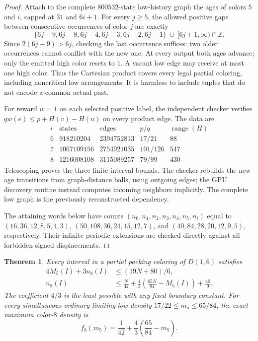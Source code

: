 \documentclass[11pt,reqno]{amsart}
\theoremstyle{plain}
\newtheorem{theorem}{Theorem}
\newcommand{\D}[1]{D(1,#1)}
\theoremstyle{plain}
\theoremstyle{plain}
\begin{document}
\begin{proof}
Attach to the complete $800532$-state low-history graph the ages of colors
$5$ and $i$, capped at $31$ and $6i+1$. For every $j\ge5$, the allowed
positive gaps between consecutive occurrences of color $j$ are exactly
\[
 \{6j-9,6j-8,6j-4,6j-3,6j-2,6j-1\}\ \cup\ [6j+1,\infty)\cap\mathbb Z.
\]
Since $2(6j-9)>6j$, checking the last occurrence suffices: two older
occurrences cannot conflict with the new one. At every output both ages
advance; only the emitted high color resets to $1$. A vacant low edge
may receive at most one high color. Thus the Cartesian product covers
every legal partial coloring, including noncritical low arrangements.
It is harmless to include tuples that do not encode a common actual past.

For reward $w=1$ on each selected positive label, the independent checker
verifies $qw(e)\le p+H(v)-H(u)$ on every product edge. The data are
\[
\begin{array}{c|r|r|c|r}
 i&\text{states}&\text{edges}&p/q&\operatorname{range}(H)\\\hline
 6&918210204&2394752813&17/21&88\\
 7&1067109156&2754921035&101/126&547\\
 8&1216008108&3115089257&79/99&430
\end{array}
\]
Telescoping proves the three finite-interval bounds. The checker rebuilds
the new age transitions from graph-distance balls, using outgoing edges;
the GPU discovery routine instead computes incoming neighbors implicitly.
The complete low graph is the previously reconstructed dependency.

The attaining words below have counts $(n_0,n_1,n_2,n_3,n_4,n_5,n_i)$ equal to
$(16,36,12,8,5,4,3)$, $(50,108,36,24,15,12,7)$, and
$(40,84,28,20,12,9,5)$, respectively. Their infinite periodic extensions
are checked directly against all forbidden signed displacements.
\end{proof}

\begin{theorem}\label{M-thm:sharp-five-eight}
Every interval in a partial packing coloring of $\D{6}$ satisfies
\begin{align}
 4M_5(I)+3n_8(I)&\le(19N+80)/6,\label{M-eq:five-eight-facet}\\
 n_8(I)&\le\frac N{42}+\frac43\left(\frac{65N}{84}-M_5(I)\right)
                    +\frac{40}{9}.\label{M-eq:five-eight-deficit}
\end{align}
The coefficient $4/3$ is the least possible with any fixed boundary
constant. For every simultaneous ordinary limiting low density
$17/22\le m_5\le65/84$, the exact maximum color-$8$ density is
\[
 f_8(m_5)=\frac1{42}+\frac43\left(\frac{65}{84}-m_5\right).
\]
\end{theorem}
\end{document}
